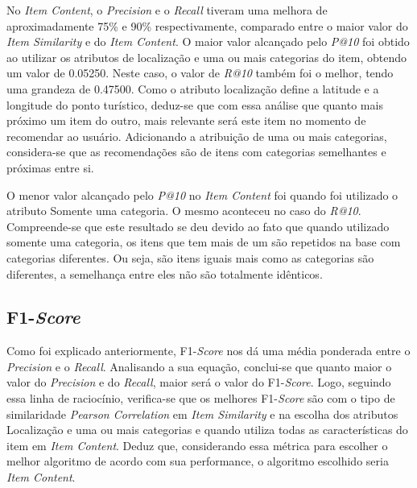 No \textit{Item Content}, o \textit{Precision} e o \textit{Recall} tiveram uma melhora de aproximadamente 75\% e 90\% respectivamente, comparado entre o maior valor do \textit{Item Similarity} e do \textit{Item Content}. O maior valor alcançado pelo \textit{P@10} foi obtido ao utilizar os atributos de localização e uma ou mais categorias do item, obtendo um valor de 0.05250. Neste caso, o valor de \textit{R@10} também foi o melhor, tendo uma grandeza de 0.47500. Como o atributo localização define a latitude e a longitude do ponto turístico, deduz-se que com essa análise que quanto mais próximo um item do outro, mais relevante será este item no momento de recomendar ao usuário. Adicionando a atribuição de uma ou mais categorias, considera-se que as recomendações são de itens com categorias semelhantes e próximas entre si.

O menor valor alcançado pelo \textit{P@10} no \textit{Item Content} foi quando foi utilizado o atributo Somente uma categoria. O mesmo aconteceu no caso do \textit{R@10}. Compreende-se que este resultado se deu devido ao fato que quando utilizado somente uma categoria, os itens que tem mais de um são repetidos na base com categorias diferentes. Ou seja, são itens iguais mais como as categorias são diferentes, a semelhança entre eles não são totalmente idênticos.

\subsection{F1-\textit{Score}}

Como foi explicado anteriormente, F1-\textit{Score} nos dá uma média ponderada entre o \textit{Precision} e o \textit{Recall}. Analisando a sua equação, conclui-se que quanto maior o valor do \textit{Precision} e do \textit{Recall}, maior será o valor do F1-\textit{Score}. Logo, seguindo essa linha de raciocínio, verifica-se que os melhores F1-\textit{Score} são com o tipo de similaridade \textit{Pearson Correlation} em \textit{Item Similarity} e na escolha dos atributos Localização e uma ou mais categorias e quando utiliza todas as características do item em \textit{Item Content}. Deduz que, considerando essa métrica para escolher o melhor algoritmo de acordo com sua performance, o algoritmo escolhido seria \textit{Item Content}.

